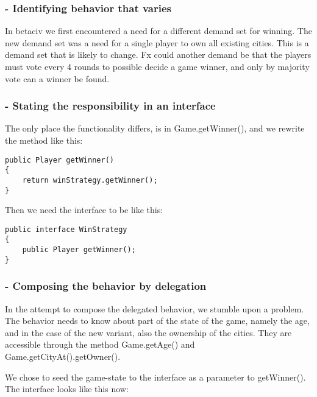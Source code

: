 
\subsubsection*{ \raisebox{.5pt}{\textcircled{\raisebox{-.9pt} {3}}} - Identifying behavior that varies}

In betaciv we first encountered a need for a different demand set for winning.
The new demand set was a need for a single player to own all existing cities. 
This is a demand set that is likely to change. 
Fx could another demand be that the players must vote every 4 rounds to possible decide a game winner, and only by majority vote can a winner be found.


\subsubsection*{ \raisebox{.5pt}{\textcircled{\raisebox{-.9pt} {1}}} - Stating the responsibility in an interface}

The only place the functionality differs, is in Game.getWinner(), and we rewrite the method like this:

\begin{lstlisting}
public Player getWinner()
{
    return winStrategy.getWinner();
}
\end{lstlisting}

Then we need the interface to be like this:
\begin{lstlisting}
public interface WinStrategy
{
    public Player getWinner();
}
\end{lstlisting}

\subsubsection*{ \raisebox{.5pt}{\textcircled{\raisebox{-.9pt} {2}}} - Composing the behavior by delegation}

In the attempt to compose the delegated behavior, we stumble upon a problem.
The behavior needs to know about part of the state of the game, namely the age, and in the case of the new variant, also the ownership of the cities.
They are accessible through the method Game.getAge() and Game.getCityAt().getOwner().

We chose to seed the game-state to the interface as a parameter to getWinner().
The interface looks like this now:


